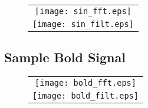 \documentclass[12pt]{article}
\begin{document}
\begin{figure}[htp!]
  \centering
    \begin{tabular}{c}
  \texttt{[image: sin\_fft.eps]} \\   
  \texttt{[image: sin\_filt.eps]}\\ 


	\end{tabular}	
	\label{figur}\caption{}
	
\end{figure}

\newpage


\subsection{Sample Bold Signal}

\begin{figure}[htp!]
  \centering
    \begin{tabular}{c}
  \texttt{[image: bold\_fft.eps]} \\   
  \texttt{[image: bold\_filt.eps]}\\ 


	\end{tabular}	
	\label{figur}\caption{}
	
\end{figure}
\end{document}
